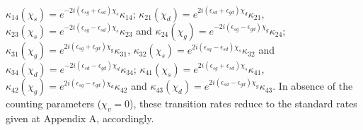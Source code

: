 \documentclass[twocolumn,preprintnumbers,amsmath,amssymb]{revtex4}
\begin{document}
$\kappa_{14}(\chi_s)=e^{-2i(\epsilon_{sg}+\epsilon_{sd})\chi_s}\kappa_{14}$;
$\kappa_{21}(\chi_d)=e^{2i(\epsilon_{sd}+\epsilon_{gd})\chi_d}\kappa_{21}$,
$\kappa_{23}(\chi_s)=e^{-2i(\epsilon_{sg}-\epsilon_{sd})\chi_s}\kappa_{23}$ and
$\kappa_{24}(\chi_g)=e^{-2i(\epsilon_{sg}-\epsilon_{gd})\chi_g}\kappa_{24}$;
$\kappa_{31}(\chi_g)=e^{2i(\epsilon_{sg}+\epsilon_{gd})\chi_g}\kappa_{31}$,
$\kappa_{32}(\chi_s)=e^{2i(\epsilon_{sg}-\epsilon_{sd})\chi_s}\kappa_{32}$ and
$\kappa_{34}(\chi_d)=e^{-2i(\epsilon_{sd}-\epsilon_{gd})\chi_d}\kappa_{34}$;
$\kappa_{41}(\chi_s)=e^{2i(\epsilon_{sg}+\epsilon_{sd})\chi_s}\kappa_{41}$,
$\kappa_{42}(\chi_g)=e^{2i(\epsilon_{sg}-\epsilon_{gd})\chi_d}\kappa_{42}$ and
$\kappa_{43}(\chi_d)=e^{2i(\epsilon_{sd}-\epsilon_{gd})\chi_g}\kappa_{43}$.
In absence of the counting parameters ($\chi_v=0$), these transition rates reduce to the standard rates given at Appendix A, accordingly.
\end{document}
